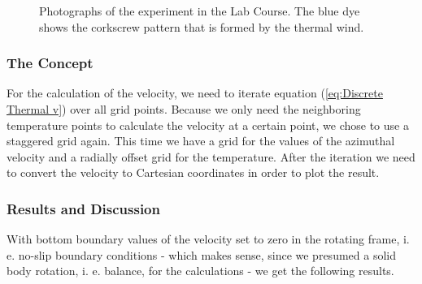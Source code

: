 \documentclass[12pt, a4paper]{article} %
\newcommand{\todoRef}{\todo[color=green!20]}
\begin{document}
		
		\begin{figure}
				\centering
			\caption{Photographs of the experiment in the Lab Course. The blue dye shows the corkscrew pattern that is formed by the thermal wind.}
		\end{figure}
		
		
		\subsubsection{The Concept}  %
			For the calculation of the velocity, we need to iterate equation (\ref{eq:Discrete Thermal v}) over all grid points. Because we only need the neighboring temperature points to calculate the velocity at a certain point, we chose to use a staggered grid again. This time we have a grid for the values of the azimuthal velocity and a radially offset grid for the temperature. After the iteration we need to convert the velocity to Cartesian coordinates in order to plot the result.
			
		\subsubsection{Results and Discussion}
			With bottom boundary values of the velocity set to zero in the rotating frame, i. e. no-slip boundary conditions - which makes sense, since we presumed a solid body rotation, i. e. balance, for the calculations - we get the following results.
			
\end{document}
